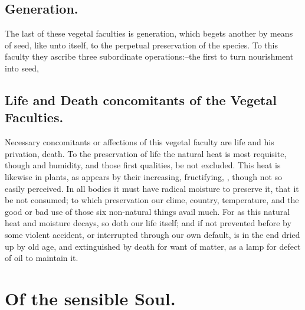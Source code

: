 \subsection{Generation.}

The last of these vegetal faculties is generation, which begets another by
means of seed, like unto itself, to the perpetual preservation of the species.
To this faculty they ascribe three subordinate operations:--the first to turn
nourishment into seed, \etc{}

\subsection{Life and Death concomitants of the Vegetal Faculties.}

Necessary concomitants or affections of this vegetal faculty are life and his
privation, death. To the preservation of life the natural heat is most
requisite, though  and humidity, and those first qualities, be not
excluded. This heat is likewise in plants, as appears by their increasing,
fructifying, \etc{}, though not so easily perceived. In all bodies it must have
radical moisture to preserve it, that it be not consumed;
to which preservation our clime, country, temperature, and the good or bad use
of those six non-natural things avail much. For as this natural heat and
moisture decays, so doth our life itself; and if not prevented before by some
violent accident, or interrupted through our own default, is in the end dried
up by old age, and extinguished by death for want of matter, as a lamp for
defect of oil to maintain it.

\section{Of the sensible Soul.}

